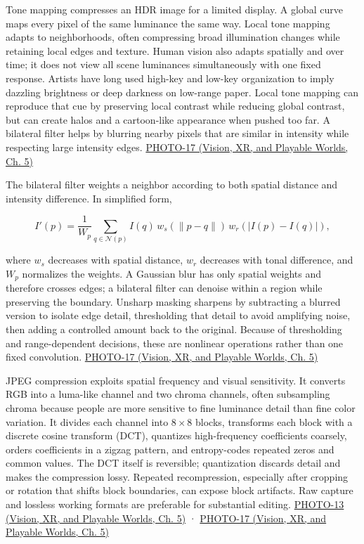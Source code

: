 Tone mapping compresses an HDR image for a limited display. A global curve maps every pixel of the same luminance the same way. Local tone mapping adapts to neighborhoods, often compressing broad illumination changes while retaining local edges and texture. Human vision also adapts spatially and over time; it does not view all scene luminances simultaneously with one fixed response. Artists have long used high-key and low-key organization to imply dazzling brightness or deep darkness on low-range paper. Local tone mapping can reproduce that cue by preserving local contrast while reducing global contrast, but can create halos and a cartoon-like appearance when pushed too far. A bilateral filter helps by blurring nearby pixels that are similar in intensity while respecting large intensity edges. \href{../07-Vision-XR-and-Playable-Worlds/main.pdf\#nameddest=04-visual-computing-ii-ch036-photo-17---photography-session-17}{PHOTO-17 (Vision, XR, and Playable Worlds, Ch. 5)}

The bilateral filter weights a neighbor according to both spatial distance and intensity difference. In simplified form,

\[
I'(p)=\frac{1}{W_p}\sum_{q\in\mathcal N(p)} I(q)\,w_s(\|p-q\|)\,w_r(|I(p)-I(q)|),
\]

where \(w_s\) decreases with spatial distance, \(w_r\) decreases with tonal difference, and \(W_p\) normalizes the weights. A Gaussian blur has only spatial weights and therefore crosses edges; a bilateral filter can denoise within a region while preserving the boundary. Unsharp masking sharpens by subtracting a blurred version to isolate edge detail, thresholding that detail to avoid amplifying noise, then adding a controlled amount back to the original. Because of thresholding and range-dependent decisions, these are nonlinear operations rather than one fixed convolution. \href{../07-Vision-XR-and-Playable-Worlds/main.pdf\#nameddest=04-visual-computing-ii-ch036-photo-17---photography-session-17}{PHOTO-17 (Vision, XR, and Playable Worlds, Ch. 5)}

JPEG compression exploits spatial frequency and visual sensitivity. It converts RGB into a luma-like channel and two chroma channels, often subsampling chroma because people are more sensitive to fine luminance detail than fine color variation. It divides each channel into \(8\times8\) blocks, transforms each block with a discrete cosine transform (DCT), quantizes high-frequency coefficients coarsely, orders coefficients in a zigzag pattern, and entropy-codes repeated zeros and common values. The DCT itself is reversible; quantization discards detail and makes the compression lossy. Repeated recompression, especially after cropping or rotation that shifts block boundaries, can expose block artifacts. Raw capture and lossless working formats are preferable for substantial editing. \href{../07-Vision-XR-and-Playable-Worlds/main.pdf\#nameddest=04-visual-computing-ii-ch036-photo-13---photography-session-13}{PHOTO-13 (Vision, XR, and Playable Worlds, Ch. 5)} · \href{../07-Vision-XR-and-Playable-Worlds/main.pdf\#nameddest=04-visual-computing-ii-ch036-photo-17---photography-session-17}{PHOTO-17 (Vision, XR, and Playable Worlds, Ch. 5)}

